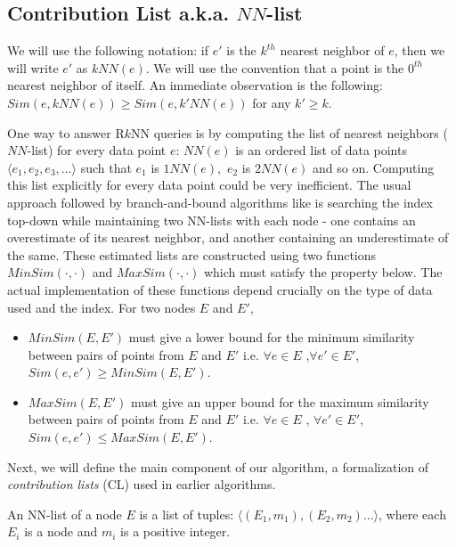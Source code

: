 \documentclass[prodmode,letterpaper]{acmsmall}
\newcommand{\rknn}{R$k$NN\xspace}
\begin{document}
\subsection{Contribution List a.k.a. $NN$-list}
We will use the following notation: if $e'$ is the $k^{th}$ nearest neighbor of $e$, then we will write $e'$ as $kNN(e)$.
We will use the convention that
a point is the $0^{th}$ nearest neighbor of itself.
An immediate observation is the following: $Sim(e,kNN(e)) \geq Sim(e,k'NN(e))$
for any $k' \geq k$.

One way to answer \rknn queries
is by computing the list of nearest neighbors ($NN$-list) for every data point $e$:
$NN(e)$ is an ordered list of data points $\langle e_1,e_2,e_3,\ldots\rangle$ such
that $e_1$ is $1NN(e),$ $e_2$ is $2NN(e)$ and so on. Computing this list explicitly for
every data point could be very inefficient. 
The usual approach followed by branch-and-bound algorithms like
\cite{achtert2009reverse,lu2011reverse,lu2014efficient} is searching the index top-down
while maintaining two NN-lists with each node - one contains an
overestimate of its nearest neighbor, and another containing an underestimate of
the same. These estimated lists are constructed using two functions
$MinSim(\cdot, \cdot)$ and $MaxSim(\cdot, \cdot)$ which must satisfy the
property below. The actual implementation of these functions depend crucially on
the type of data used and the index. For two nodes $E$ and $E'$,
\begin{itemize}
    \item $MinSim(E,E')$ must give a lower bound for the minimum similarity between pairs of
points from $E$ and $E'$ i.e. $\forall e \in E$ ,$ \forall e' \in E'$,
$Sim(e,e') \geq MinSim(E,E')$.
    \item $MaxSim(E,E')$ must give an upper bound for the maximum similarity between pairs of points from $E$ and $E'$ i.e. $\forall e \in E$ , $\forall e' \in E'$, $Sim(e,e') \leq MaxSim(E,E')$.
\end{itemize}

Next, we will define the main component of our algorithm, a formalization of
{\em contribution lists} (CL) used in earlier algorithms.

\begin{definition}
An NN-list of a node $E$ is a list of tuples: $\langle (E_1,m_1),(E_2,m_2)
\ldots \rangle$, where each $E_i$ is a node and $m_i$ is a positive integer.
\end{definition}
\end{document}
